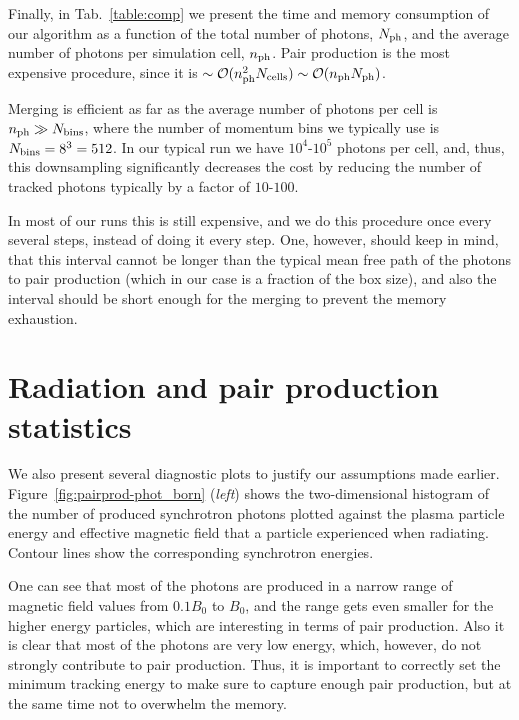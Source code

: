 Finally, in Tab.~\ref{table:comp} we present the time and memory consumption of our algorithm as a function of the total number of photons, $N_{\rm ph}$, and the average number of photons per simulation cell, $n_{\rm ph}$. Pair production is the most expensive procedure, since it is $\sim\mathcal{O}(n_{\rm ph}^2 N_{\rm cells}) \sim \mathcal{O}(n_{\rm ph} N_{\rm ph})$.

Merging is efficient as far as the average number of photons per cell is $n_{\rm ph}\gg N_{\rm bins}$, where the number of momentum bins we typically use is $N_{\rm bins}=8^3=512$. In our typical run we have $10^4\text{-}10^5$ photons per cell, and, thus, this downsampling significantly decreases the cost by reducing the number of tracked photons typically by a factor of $10\text{-}100$.

In most of our runs this is still expensive, and we do this procedure once every several steps, instead of doing it every step. One, however, should keep in mind, that this interval cannot be longer than the typical mean free path of the photons to pair production (which in our case is a fraction of the box size), and also the interval should be short enough for the merging to prevent the memory exhaustion.


\section{Radiation and pair production statistics}
\label{sec:pairprod-appendixB}

We also present several diagnostic plots to justify our assumptions made earlier. Figure~\ref{fig:pairprod-phot_born} ({\it left}) shows the two-dimensional histogram of the number of produced synchrotron photons plotted against the plasma particle energy and effective magnetic field that a particle experienced when radiating. Contour lines show the corresponding synchrotron energies.

One can see that most of the photons are produced in a narrow range of magnetic field values from $0.1B_0$ to $B_0$, and the range gets even smaller for the higher energy particles, which are interesting in terms of pair production. Also it is clear that most of the photons are very low energy, which, however, do not strongly contribute to pair production. Thus, it is important to correctly set the minimum tracking energy to make sure to capture enough pair production, but at the same time not to overwhelm the memory.

